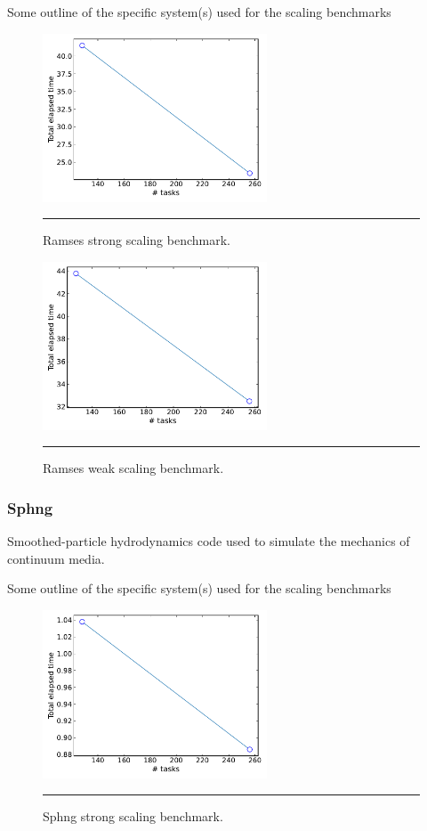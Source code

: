 \documentclass[10pt]{article}
\begin{document}
{\color{red} Some outline of the specific system(s) used for the scaling benchmarks}

\begin{figure}[h!]
	\centering
	\includegraphics[height=5cm]{Ramses_strong.pdf}
	\vspace{0.1cm}
	\hrule
	\vspace{0.01cm}
	\caption{Ramses strong scaling benchmark.}
	\label{fig::ramses_ss}
\end{figure}


\begin{figure}[h!]
	\centering
	\includegraphics[height=5cm]{Ramses_weak.pdf}
	\vspace{0.1cm}
	\hrule
	\vspace{0.01cm}
	\caption{Ramses weak scaling benchmark.}
	\label{fig::ramses_ws}
\end{figure}


\clearpage
\subsubsection{Sphng}
Smoothed-particle hydrodynamics code used to simulate the mechanics of
continuum media.

{\color{red} Some outline of the specific system(s) used for the scaling benchmarks}


\begin{figure}[h!]
	\centering
	\includegraphics[height=5cm]{Sphng_strong.pdf}
	\vspace{0.1cm}
	\hrule
	\vspace{0.01cm}
	\caption{Sphng strong scaling benchmark.}
	\label{fig::sphng_ss}
\end{figure}
\end{document}
